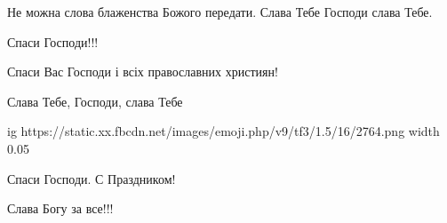 \begin{itemize}
 
Не можна слова блаженства Божого передати. Слава Тебе Господи слава Тебе.

 
Спаси Господи!!!

 
Спаси Вас Господи і всіх православних християн!

 
Слава Тебе, Господи, слава Тебе

 

\ifcmt
  ig https://static.xx.fbcdn.net/images/emoji.php/v9/tf3/1.5/16/2764.png
  width 0.05
\fi

 
Спаси Господи.
С
Праздником!

 
Слава Богу за все!!!

 

\end{itemize}
